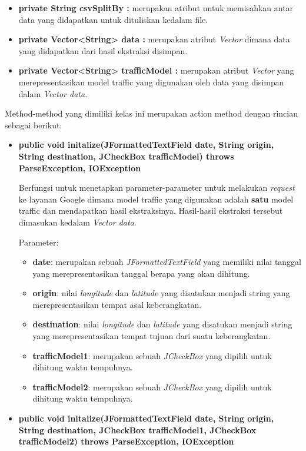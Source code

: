 \begin{enumerate}
	\begin{itemize}
		\item \textbf{private String csvSplitBy :} merupakan atribut untuk memisahkan antar data yang didapatkan untuk dituliskan kedalam file.
		\item \textbf{private Vector<String> data :} merupakan atribut \textit{Vector} dimana data yang didapatkan dari hasil ekstraksi disimpan.
		\item \textbf{private Vector<String> trafficModel :} merupakan atribut \textit{Vector} yang merepresentasikan model traffic yang digunakan oleh data yang disimpan dalam \textit{Vector data}.
	\end{itemize}
	
	Method-method yang dimiliki kelas ini merupakan action method dengan rincian sebagai berikut:
	
	\begin{itemize}
		\item \textbf{public void initalize(JFormattedTextField date, String origin, String destination, JCheckBox trafficModel) throws ParseException, IOException} 
		
		Berfungsi untuk menetapkan parameter-parameter untuk melakukan \textit{request} ke layanan Google dimana model traffic yang digunakan adalah \textbf{satu} model traffic dan mendapatkan hasil ekstraksinya. Hasil-hasil ekstraksi tersebut dimasukan kedalam \textit{Vector data}.
		
		Parameter:
	\begin{itemize}
		\item \textbf{date}: merupakan sebuah \textit{JFormattedTextField} yang memiliki nilai tanggal yang merepresentasikan tanggal berapa yang akan dihitung. 
		\item \textbf{origin}: nilai \textit{longitude} dan \textit{latitude} yang disatukan menjadi string yang merepresentasikan tempat asal keberangkatan.
		\item \textbf{destination}: nilai \textit{longitude} dan \textit{latitude} yang disatukan menjadi string yang merepresentasikan tempat tujuan dari suatu keberangkatan.
		\item \textbf{trafficModel1}: merupakan sebuah \textit{JCheckBox} yang dipilih untuk dihitung waktu tempuhnya.
		\item \textbf{trafficModel2}: merupakan sebuah \textit{JCheckBox} yang dipilih untuk dihitung waktu tempuhnya.
	\end{itemize}
		
		\item \textbf{public void initalize(JFormattedTextField date, String origin, String destination, JCheckBox trafficModel1, JCheckBox trafficModel2) throws ParseException, IOException}
		

\end{itemize}
\end{enumerate}

